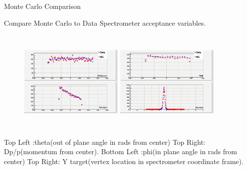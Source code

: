 \documentclass{beamer}
\begin{document}
\begin{frame}{Monte Carlo Comparison}
		\vspace{-22pt}
	\begin{block}{Compare Monte Carlo to Data}
	 Spectrometer acceptance variables. 
		\vspace{-12pt}
		\begin{figure}[t]%
			\includegraphics[width=5cm,height=5cm]{../images/xp_yp_tar_1207.png}
			\includegraphics[width=5cm,height=5cm]{../images/dp_ytar_1207.png}
		\end{figure}
		\vspace{-12pt}	
		Top Left :theta(out of plane angle in rads from center)  Top Right: Dp/p(momentum from center).
		Bottom Left :phi(in plane angle in rads from center)  Top Right: Y target(vertex location in spectrometer coordinate frame).
	\end{block}	
\end{frame}
\end{document}
